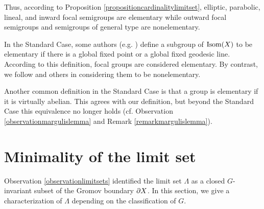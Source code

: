 Thus, according to Proposition \ref{propositioncardinalitylimitset}, elliptic, parabolic, lineal, and inward focal semigroups are elementary while outward focal semigroups and semigroups of general type are nonelementary.

\begin{remark}
In the Standard Case, some authors (e.g. \cite[]{Ratcliffe}) define a subgroup of $\operatorname{Isom}(X)$ to be elementary if there is a global fixed point or a global fixed geodesic line. According to this definition, focal groups are considered elementary. By contrast, we follow \cite{CCMT} and others in considering them to be nonelementary.

Another common definition in the Standard Case is that a group is elementary if it is virtually abelian. This agrees with our definition, but beyond the Standard Case this equivalence no longer holds (cf. Observation \ref{observationmargulislemma} and Remark \ref{remarkmargulislemma}).
\end{remark}

\bigskip
\section{Minimality of the limit set}

Observation \ref{observationlimitsets} identified the limit set $\Lambda$ as a closed $G$-invariant subset of the Gromov boundary $\partial X$. In this section, we give a characterization of $\Lambda$ depending on the classification of $G$.

